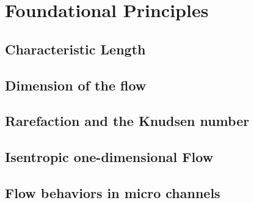 \section{Foundational Principles}

\subsection{Characteristic Length}  

\newpage

\subsection{Dimension of the flow}


\subsection{Rarefaction and the Knudsen number}


\subsection{Isentropic one-dimensional Flow}


\subsection{Flow behaviors in micro channels}


